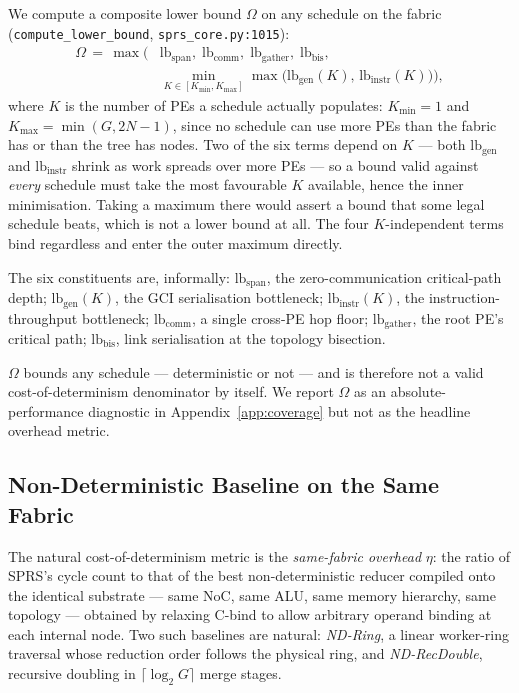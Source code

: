 \documentclass[journal,10pt]{IEEEtran}
\theoremstyle{plain}
\theoremstyle{definition}
\theoremstyle{remark}
\newcommand{\sprs}{\textsc{SPRS}}
\newcommand{\sv}[1]{\texttt{#1}}
\begin{document}
We compute a composite lower bound $\Omega$ on any schedule on the
fabric (\sv{compute\_lower\_bound}, \sv{sprs\_core.py:1015}):
\begin{equation}\label{eq:omega}
\begin{split}
\Omega \,=\, \max \bigl(
    & \text{lb}_{\text{span}}, \;
      \text{lb}_{\text{comm}}, \;
      \text{lb}_{\text{gather}}, \;
      \text{lb}_{\text{bis}}, \\
    & \min_{K \in [K_{\min}, K_{\max}]}
      \max \bigl( \text{lb}_{\text{gen}}(K), \, \text{lb}_{\text{instr}}(K) \bigr)
\bigr),
\end{split}
\end{equation}
where $K$ is the number of PEs a schedule actually populates: $K_{\min} = 1$
and $K_{\max} = \min(G, 2N-1)$, since no schedule can use more PEs than the
fabric has or than the tree has nodes. Two of the six terms depend on $K$ ---
both $\text{lb}_{\text{gen}}$ and $\text{lb}_{\text{instr}}$ shrink as work
spreads over more PEs --- so a bound valid against \emph{every} schedule must
take the most favourable $K$ available, hence the inner minimisation. Taking
a maximum there would assert a bound that some legal schedule beats, which is
not a lower bound at all. The four $K$-independent terms bind regardless and
enter the outer maximum directly.

The six constituents are, informally:
$\text{lb}_{\text{span}}$, the zero-communication critical-path depth;
$\text{lb}_{\text{gen}}(K)$, the GCI serialisation bottleneck;
$\text{lb}_{\text{instr}}(K)$, the instruction-throughput bottleneck;
$\text{lb}_{\text{comm}}$, a single cross-PE hop floor;
$\text{lb}_{\text{gather}}$, the root PE's critical path;
$\text{lb}_{\text{bis}}$, link serialisation at the topology bisection.

$\Omega$ bounds any schedule --- deterministic or not --- and is
therefore not a valid cost-of-determinism denominator by itself. We
report $\Omega$ as an absolute-performance diagnostic in
Appendix~\ref{app:coverage} but not as the headline overhead metric.

\subsection{Non-Deterministic Baseline on the Same Fabric}\label{sec:method-nd}

The natural cost-of-determinism metric is the \emph{same-fabric overhead}
$\eta$: the ratio of \sprs{}'s cycle count to that of the best
non-deterministic reducer compiled onto the identical substrate --- same NoC,
same ALU, same memory hierarchy, same topology --- obtained by relaxing
\textsf{C-bind} to allow arbitrary operand binding at each internal node.
Two such baselines are natural: \emph{ND-Ring}, a linear worker-ring
traversal whose reduction order follows the physical ring, and
\emph{ND-RecDouble}, recursive doubling in $\lceil\log_2 G\rceil$ merge
stages.
\end{document}
